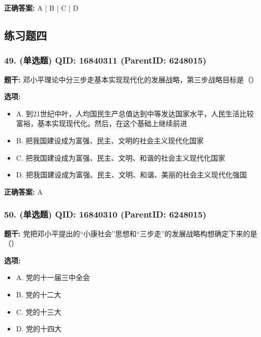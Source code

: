 \documentclass[12pt,UTF8]{ctexart}
\begin{document}
\textbf{正确答案:}
A | B | C | D

\vspace{0.3em}\hrulefill\vspace{0.7em}

\subsection*{练习题四}

\subsubsection*{49. (单选题) \small QID: 16840311 (ParentID: 6248015)}

\textbf{题干:}
邓小平理论中分三步走基本实现现代化的发展战略，第三步战略目标是（）



\textbf{选项:}
\begin{itemize}[leftmargin=*]

  \item A. 到21世纪中叶，人均国民生产总值达到中等发达国家水平，人民生活比较富裕，基本实现现代化。然后，在这个基础上继续前进

  \item B. 把我国建设成为富强、民主、文明的社会主义现代化国家

  \item C. 把我国建设成为富强、民主、文明、和谐的社会主义现代化国家

  \item D. 把我国建设成为富强、民主、文明、和谐、美丽的社会主义现代化强国

\end{itemize}

\textbf{正确答案:}
A

\vspace{0.3em}\hrulefill\vspace{0.7em}

\subsubsection*{50. (单选题) \small QID: 16840310 (ParentID: 6248015)}

\textbf{题干:}
党把邓小平提出的“小康社会”思想和“三步走”的发展战略构想确定下来的是（）



\textbf{选项:}
\begin{itemize}[leftmargin=*]

  \item A. 党的十一届三中全会

  \item B. 党的十二大

  \item C. 党的十三大

  \item D. 党的十四大

\end{itemize}
\end{document}
